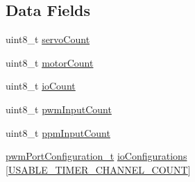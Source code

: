 \subsection*{Data Fields}
\begin{DoxyCompactItemize}
\item 
uint8\+\_\+t \hyperlink{structpwmIOConfiguration__s_a634ede6d9c6144bdbc1e1bfb3818051d}{servo\+Count}
\item 
uint8\+\_\+t \hyperlink{structpwmIOConfiguration__s_ae9f56c7b4a4c36e920207e8feafc1bf7}{motor\+Count}
\item 
uint8\+\_\+t \hyperlink{structpwmIOConfiguration__s_ab700c659df1fe037904d836b04ee4562}{io\+Count}
\item 
uint8\+\_\+t \hyperlink{structpwmIOConfiguration__s_a4d254e564c65776178df66931d612f16}{pwm\+Input\+Count}
\item 
uint8\+\_\+t \hyperlink{structpwmIOConfiguration__s_ac7880462905c1587bb9dde1f06d18f47}{ppm\+Input\+Count}
\item 
\hyperlink{pwm__mapping_8h_af59f08a843dfb64432906e7fd23f904a}{pwm\+Port\+Configuration\+\_\+t} \hyperlink{structpwmIOConfiguration__s_a9adce3819477d5155479197d220853ea}{io\+Configurations} \mbox{[}\hyperlink{main_2target_2SPRACINGF3MINI_2target_8h_a188175cb4142f3836bf69f198daaaec9}{U\+S\+A\+B\+L\+E\+\_\+\+T\+I\+M\+E\+R\+\_\+\+C\+H\+A\+N\+N\+E\+L\+\_\+\+C\+O\+U\+N\+T}\mbox{]}
\end{DoxyCompactItemize}


